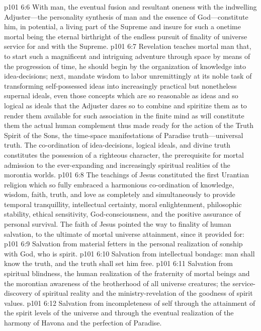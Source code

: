 \vs p101 6:6 With man, the eventual fusion and resultant oneness with the indwelling Adjuster---the personality synthesis of man and the essence of God---constitute him, in potential, a living part of the Supreme and insure for such a onetime mortal being the eternal birthright of the endless pursuit of finality of universe service for and with the Supreme.\plusone
\pc \vs p101 6:7 Revelation teaches mortal man that, to start such a magnificent and intriguing adventure through space by means of the progression of time, he should begin by the organization of knowledge into idea\hyp{}decisions; next, mandate wisdom to labor unremittingly at its noble task of transforming self\hyp{}possessed ideas into increasingly practical but nonetheless supernal ideals, even those concepts which are so reasonable as ideas and so logical as ideals that the Adjuster dares so to combine and spiritize them as to render them available for such association in the finite mind as will constitute them the actual human complement thus made ready for the action of the Truth Spirit of the Sons, the time\hyp{}space manifestations of Paradise truth---universal truth. The co\hyp{}ordination of idea\hyp{}decisions, logical ideals, and divine truth constitutes the possession of a righteous character, the prerequisite for mortal admission to the ever\hyp{}expanding and increasingly spiritual realities of the morontia worlds.\plusone
\vs p101 6:8 The teachings of Jesus constituted the first Urantian religion which so fully embraced a harmonious co\hyp{}ordination of knowledge, wisdom, faith, truth, and love as completely and simultaneously to provide temporal tranquillity, intellectual certainty, moral enlightenment, philosophic stability, ethical sensitivity, God\hyp{}consciousness, and the positive assurance of personal survival. The faith of Jesus pointed the way to finality of human salvation, to the ultimate of mortal universe attainment, since it provided for:
\pc \vs p101 6:9 \bibnobreakspace Salvation from material fetters in the personal realization of sonship with God, who is spirit.
\pc \vs p101 6:10 \bibnobreakspace Salvation from intellectual bondage: man shall know the truth, and the truth shall set him free.
\pc \vs p101 6:11 \bibnobreakspace Salvation from spiritual blindness, the human realization of the fraternity of mortal beings and the morontian awareness of the brotherhood of all universe creatures; the service\hyp{}discovery of spiritual reality and the ministry\hyp{}revelation of the goodness of spirit values.
\pc \vs p101 6:12 \bibnobreakspace Salvation from incompleteness of self through the attainment of the spirit levels of the universe and through the eventual realization of the harmony of Havona and the perfection of Paradise.
